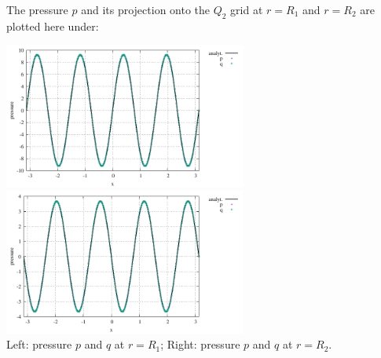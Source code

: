 The pressure $p$ and its projection onto the $Q_2$ grid at 
$r=R_1$ and $r=R_2$ are plotted here under:

\begin{center}
\includegraphics[width=8cm]{python_codes/fieldstone_21/results/pressure_R1.pdf}
\includegraphics[width=8cm]{python_codes/fieldstone_21/results/pressure_R2.pdf}\\
{\captionfont Left: pressure $p$ and $q$ at $r=R_1$; Right: 
pressure $p$ and $q$ at $r=R_2$.}
\end{center}

